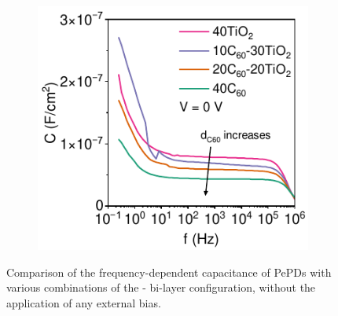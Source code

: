 \begin{figure}[ht!]
    \centering
    
    \begin{subfigure}[t]{0.45\textwidth}
        \centering
        \includegraphics[width=\textwidth]{chapters/transport_layers/images/Cf_comparison.pdf} %
        
    \end{subfigure}
    \caption[Comparison of the frequency-dependent capacitance of PePDs with various combinations of the - bi-layer configuration.]{Comparison of the frequency-dependent capacitance of PePDs with various combinations of the - bi-layer configuration, without the application of any external bias. }
    \label{fig:etl_opt:capacitance}
\end{figure}


